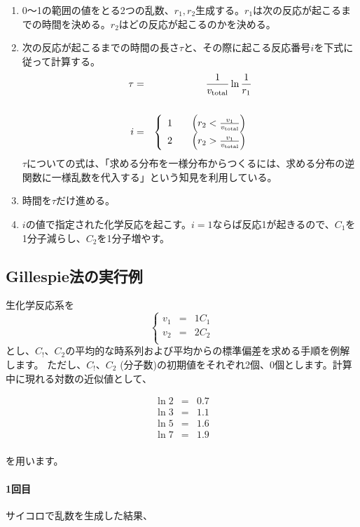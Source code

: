 \begin{enumerate}
\item 0〜1の範囲の値をとる2つの乱数、$r_1, r_2$生成する。$r_1$は次の反応が起こるまでの時間を決める。$r_2$はどの反応が起こるのかを決める。
\item 次の反応が起こるまでの時間の長さ$\tau$と、その際に起こる反応番号$i$を下式に従って計算する。
\begin{eqnarray*}
\tau & = & \frac{1}{v_{\rm total}}\ln\frac{1}{r_1}\\
& &\\
i & = & \left\{
\begin{array}{lll}
1 & & \left(r_2 < \frac{v_1}{v_{\rm total}}\right)\\
2 & & \left(r_2 > \frac{v_1}{v_{\rm total}}\right)\\
\end{array}
\right.
\end{eqnarray*}
$\tau$についての式は、「求める分布を一様分布からつくるには、求める分布の逆関数に一様乱数を代入する」という知見を利用している。
\item 時間を$\tau$だけ進める。
\item $i$の値で指定された化学反応を起こす。$i=1$ならば反応1が起きるので、$C_1$を1分子減らし、$C_2$を1分子増やす。
\end{enumerate}

\subsection{Gillespie法の実行例}
生化学反応系を
\[\left\{
\begin{array}{lcl}
v_1 & = & 1 C_1 \\ 
v_2 & = & 2 C_2 \\ 
\end{array}
\right.\]
とし、\(C_!\)、\(C_2\)の平均的な時系列および平均からの標準偏差を求める手順を例解します。
ただし、\(C_!\)、\(C_2\) (分子数)の初期値をそれぞれ2個、0個とします。計算中に現れる対数の近似値として、

\begin{eqnarray*}
\ln 2 & = & 0.7 \\
\ln 3 & = & 1.1 \\
\ln 5 & = & 1.6 \\
\ln 7 & = & 1.9 \\
\end{eqnarray*}

を用います。

\paragraph{1回目}
サイコロで乱数を生成した結果、

